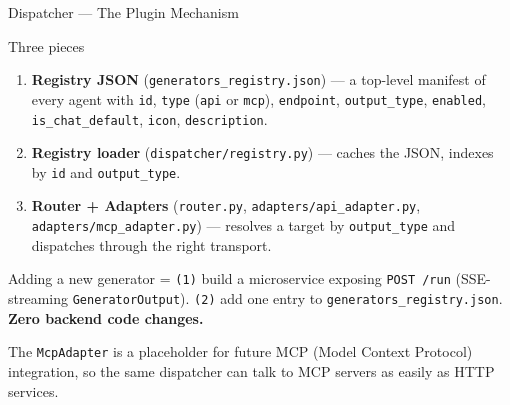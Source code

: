 \documentclass[aspectratio=169, 10pt]{beamer}
\begin{document}
\begin{frame}{Dispatcher --- The Plugin Mechanism}
  \scriptsize
  \begin{block}{Three pieces}
    \begin{enumerate}
      \setlength\itemsep{0pt}
      \item \textbf{Registry JSON} (\texttt{generators\_registry.json}) --- a
            top-level manifest of every agent with \texttt{id},
            \texttt{type} (\texttt{api} or \texttt{mcp}),
            \texttt{endpoint}, \texttt{output\_type}, \texttt{enabled},
            \texttt{is\_chat\_default}, \texttt{icon}, \texttt{description}.
      \item \textbf{Registry loader} (\texttt{dispatcher/registry.py}) ---
            caches the JSON, indexes by \texttt{id} and \texttt{output\_type}.
      \item \textbf{Router + Adapters} (\texttt{router.py},
            \texttt{adapters/api\_adapter.py},
            \texttt{adapters/mcp\_adapter.py}) --- resolves a target by
            \texttt{output\_type} and dispatches through the right transport.
    \end{enumerate}
  \end{block}

  \begin{exampleblock}{Adding a new generator =}
    \scriptsize
    \texttt{(1)} build a microservice exposing
    \texttt{POST /run} (SSE-streaming \texttt{GeneratorOutput}). \quad
    \texttt{(2)} add one entry to \texttt{generators\_registry.json}. \quad
    \textbf{Zero backend code changes.}
  \end{exampleblock}

  \scriptsize
  The \texttt{McpAdapter} is a placeholder for future MCP (Model Context
  Protocol) integration, so the same dispatcher can talk to MCP servers
  as easily as HTTP services.
\end{frame}
\end{document}
